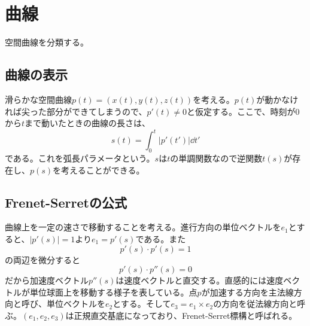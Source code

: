 \section{曲線}

空間曲線を分類する。

\subsection{曲線の表示}
    滑らかな空間曲線$p(t) = (x(t), y(t), z(t))$を考える。$p(t)$が動かなければ尖った部分ができてしまうので、$p'(t) \neq 0$と仮定する。ここで、時刻が0から$t$まで動いたときの曲線の長さは、
        \[s(t) = \int_0^t |p'(t')| \dd{t'}\]
    である。これを弧長パラメータという。$s$は$t$の単調関数なので逆関数$t(s)$が存在し、$p(s)$を考えることができる。

\subsection{Frenet-Serretの公式}
    曲線上を一定の速さで移動することを考える。進行方向の単位ベクトルを$e_1$とすると、$|p'(s)| = 1$より$e_1 = p'(s)$である。また
        \[p'(s) \cdot p'(s) = 1\]
    の両辺を微分すると
        \[p'(s) \cdot p''(s) = 0\]
    だから加速度ベクトル$p''(s)$は速度ベクトルと直交する。直感的には速度ベクトルが単位球面上を移動する様子を表している。点$p$が加速する方向を主法線方向と呼び、単位ベクトルを$e_2$とする。そして$e_3 = e_1 \times e_2$の方向を従法線方向と呼ぶ。$(e_1, e_2, e_3)$は正規直交基底になっており、Frenet-Serret標構と呼ばれる。

